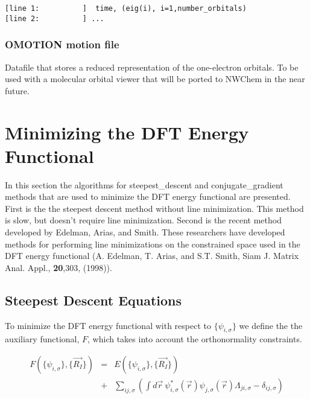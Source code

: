 \begin{verbatim}
[line 1:          ]  time, (eig(i), i=1,number_orbitals)
[line 2:          ] ...
\end{verbatim}


\subsubsection{OMOTION motion file}
Datafile that stores a reduced representation of the
one-electron orbitals.  To be used with a molecular
orbital viewer that will be ported to NWChem
in the near future. 


\section{Minimizing the DFT Energy Functional}
\label{sec:pspw_Minimize}

In this section the algorithms for steepest\_descent and conjugate\_gradient 
methods that are used to minimize the DFT energy functional are presented.
First is the the steepest descent method without line minimization.   
This method is slow, but doesn't require line minimization.  
Second is the recent method developed by Edelman, Arias, and Smith.
These researchers have developed methods for performing line minimizations
on the constrained space used in the DFT energy functional
(A. Edelman, T. Arias, and S.T. Smith, Siam J. Matrix Anal. Appl., 
\textbf{20},303, (1998)).


\subsection{Steepest Descent Equations}
\label{sec:pspw_sd2}

To minimize the DFT energy functional with respect to $\{\psi_{i,\sigma}\}$
we define the the auxiliary functional, $F$, which takes into account
the orthonormality constraints.

\begin{eqnarray}
F\left(\{\psi_{i,\sigma}\},\{\vec{R_I}\} \right)
&=& E\left(\{\psi_{i,\sigma}\},\{\vec{R_I}\} \right) \nonumber \\
&+&\sum_{ij,\sigma}  \left( \int d\vec{r}\ 
\psi_{i,\sigma}^{*}(\vec{r}) \psi_{j,\sigma}(\vec{r}) \Lambda_{ji,\sigma}
                 - \delta_{ij,\sigma} 
\right) 
\label{eq:sd1}
\end{eqnarray}

